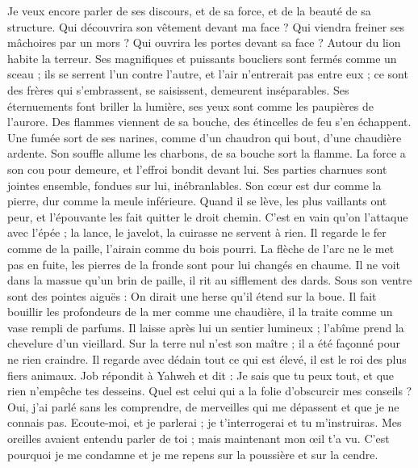 \begin{multicols}{2}
Je veux encore parler de ses discours, et de sa force, et de la beauté de sa structure.
Qui découvrira son vêtement devant ma face ? Qui viendra freiner ses mâchoires par un mors ?
Qui ouvrira les portes devant sa face ? Autour du lion habite la terreur.
Ses magnifiques et puissants boucliers sont fermés comme un sceau ;
ils se serrent l'un contre l'autre, et l'air n'entrerait pas entre eux ;
ce sont des frères qui s'embrassent, se saisissent, demeurent inséparables.
Ses éternuements font briller la lumière, ses yeux sont comme les paupières de l'aurore.
Des flammes viennent de sa bouche, des étincelles de feu s'en échappent.
Une fumée sort de ses narines, comme d'un chaudron qui bout, d'une chaudière ardente.
Son souffle allume les charbons, de sa bouche sort la flamme.
La force a son cou pour demeure, et l'effroi bondit devant lui.
Ses parties charnues sont jointes ensemble, fondues sur lui, inébranlables.
Son cœur est dur comme la pierre, dur comme la meule inférieure.
Quand il se lève, les plus vaillants ont peur, et l'épouvante les fait quitter le droit chemin.
C'est en vain qu'on l'attaque avec l'épée ; la lance, le javelot, la cuirasse ne servent à rien.
Il regarde le fer comme de la paille, l'airain comme du bois pourri.
La flèche de l'arc ne le met pas en fuite, les pierres de la fronde sont pour lui changés en chaume.
Il ne voit dans la massue qu'un brin de paille, il rit au sifflement des dards.
Sous son ventre sont des pointes aiguës : On dirait une herse qu'il étend sur la boue.
Il fait bouillir les profondeurs de la mer comme une chaudière, il la traite comme un vase rempli de parfums.
Il laisse après lui un sentier lumineux ; l'abîme prend la chevelure d'un vieillard.
Sur la terre nul n'est son maître ; il a été façonné pour ne rien craindre.
Il regarde avec dédain tout ce qui est élevé, il est le roi des plus fiers animaux.
\VerseOne{}Job répondit à Yahweh et dit :
Je sais que tu peux tout, et que rien n'empêche tes desseins.
Quel est celui qui a la folie d'obscurcir mes conseils ? Oui, j'ai parlé sans les comprendre, de merveilles qui me dépassent et que je ne connais pas.
Ecoute-moi, et je parlerai ; je t'interrogerai et tu m'instruiras.
Mes oreilles avaient entendu parler de toi ; mais maintenant mon œil t'a vu.
C'est pourquoi je me condamne et je me repens sur la poussière et sur la cendre.

\end{multicols}
